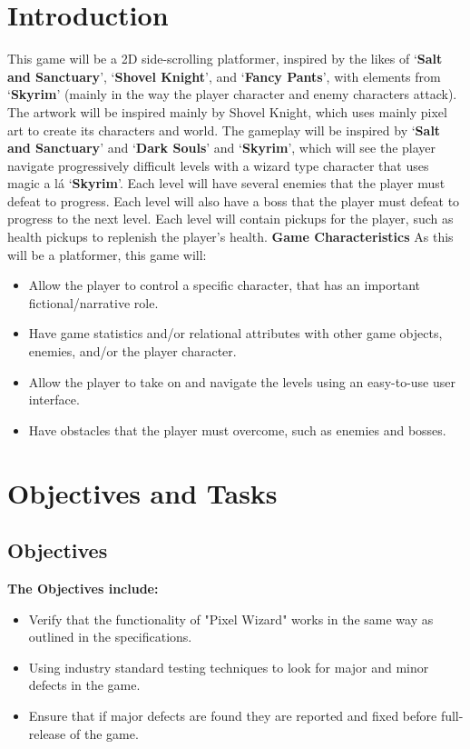 \documentclass[a4paper, 10pt]{article}
\begin{document}
\section{Introduction}
    This game will be a 2D side-scrolling platformer, inspired by the likes of ‘\textbf{Salt and Sanctuary}’, ‘\textbf{Shovel  Knight}’, and ‘\textbf{Fancy  Pants}’, with elements from ‘\textbf{Skyrim}’ (mainly in the way the player character and enemy characters attack).
    The artwork will be inspired mainly by Shovel Knight, which uses mainly pixel art to create its characters and world. \newline
    The gameplay will be inspired by ‘\textbf{Salt and Sanctuary}’ and ‘\textbf{Dark Souls}’ and ‘\textbf{Skyrim}’, which will see the player navigate  progressively  difficult  levels  with  a  wizard type  character  that  uses magic a lá ‘\textbf{Skyrim}’.\newline
    Each level will have several enemies that the player must defeat to progress. Each level will also have a boss that the player must defeat to progress to the next level. Each level will contain pickups for the player, such as health pickups to replenish the player’s health.\newline \newline 
    \textbf{Game Characteristics}
    \newline 
    As this will be a platformer, this game will: 
    \begin{itemize}
        \item Allow the player to control a specific character, that has an important fictional/narrative role.
        \item Have game statistics and/or relational attributes with other game objects, enemies, and/or the player character.
        \item Allow  the  player to take on and navigate the levels using  an easy-to-use  user interface.
        \item Have obstacles that the player must overcome, such as enemies and bosses.
    \end{itemize}

\section{Objectives and Tasks}
    \subsection{Objectives}
    \textbf{The Objectives include:}
    \begin{itemize}
        \item Verify that the functionality of "Pixel Wizard" works in the same way as       outlined in the specifications.
        \item Using industry standard testing techniques to look for major and minor defects in the game.
        \item Ensure that if major defects are found they are reported and fixed before full-release of the game.
    \end{itemize}
    
\end{document}

